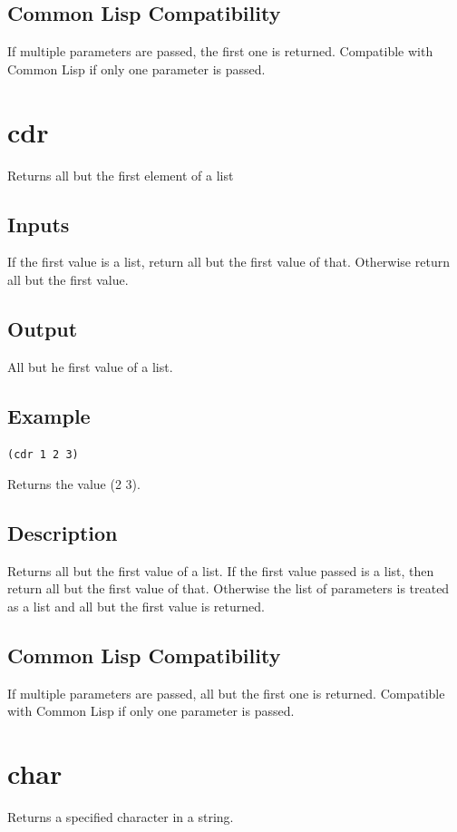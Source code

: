 \documentclass[10pt, openany]{book}
\newcommand{\cl}{Common Lisp}
\begin{document}
\subsection{Common Lisp Compatibility}
If multiple parameters are passed, the first one is returned.  Compatible with \cl{} if only one parameter is passed.

\section{cdr}
Returns all but the first element of a list
\subsection{Inputs}
If the first value is a list, return all but the first value of that.  Otherwise return all but the first value.
\subsection{Output}
All but he first value of a list.
\subsection{Example}
\begin{lstlisting}
(cdr 1 2 3)
\end{lstlisting}
Returns the value (2 3).
\subsection{Description}
Returns all but the first value of a list.  If the first value passed is a list, then return all but the first value of that.  Otherwise the list of parameters is treated as a list and all but the first value is returned.
\subsection{Common Lisp Compatibility}
If multiple parameters are passed, all but the first one is returned.  Compatible with \cl{} if only one parameter is passed.

\section{char}
Returns a specified character in a string.
\end{document}
